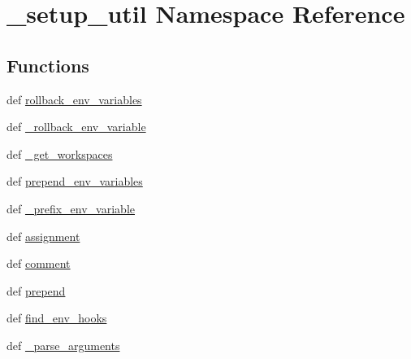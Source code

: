 \hypertarget{namespace__setup__util}{\section{\-\_\-setup\-\_\-util \-Namespace \-Reference}
\label{namespace__setup__util}
}
\subsection*{\-Functions}
\begin{DoxyCompactItemize}
\item 
def \hyperlink{namespace__setup__util_a5b1728beb6e19ccf126bf9e02de6083e}{rollback\-\_\-env\-\_\-variables}
\item 
def \hyperlink{namespace__setup__util_a93f66029f749da0fa9796a4247778677}{\-\_\-rollback\-\_\-env\-\_\-variable}
\item 
def \hyperlink{namespace__setup__util_a4bc0c7ebbb559ce956160349b3077301}{\-\_\-get\-\_\-workspaces}
\item 
def \hyperlink{namespace__setup__util_a44654f701304ecab7e37798abf014d1a}{prepend\-\_\-env\-\_\-variables}
\item 
def \hyperlink{namespace__setup__util_a0d916ad34eea6871514c36f6e928d431}{\-\_\-prefix\-\_\-env\-\_\-variable}
\item 
def \hyperlink{namespace__setup__util_a7983d4ea2ecdeaf54e133950d8a76e77}{assignment}
\item 
def \hyperlink{namespace__setup__util_a9d73115db9efca5c20b575f96b9eb065}{comment}
\item 
def \hyperlink{namespace__setup__util_a4ced140c2841c9a3e692bf39d98aa9eb}{prepend}
\item 
def \hyperlink{namespace__setup__util_aad4a41589ebc32e81406c63db26e721a}{find\-\_\-env\-\_\-hooks}
\item 
def \hyperlink{namespace__setup__util_a68bdee5b1b36ce340607c5f122fc04ff}{\-\_\-parse\-\_\-arguments}
\end{DoxyCompactItemize}
